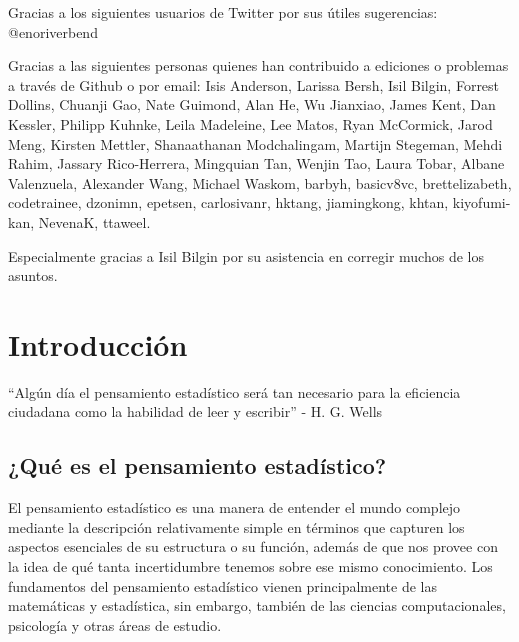 \documentclass[
  12pt,
]{book}
\begin{document}
Gracias a los siguientes usuarios de Twitter por sus útiles sugerencias: @enoriverbend

Gracias a las siguientes personas quienes han contribuido a ediciones o problemas a través de Github o por email:
Isis Anderson, Larissa Bersh, Isil Bilgin, Forrest Dollins, Chuanji Gao, Nate Guimond, Alan He, Wu Jianxiao, James Kent, Dan Kessler, Philipp Kuhnke, Leila Madeleine, Lee Matos, Ryan McCormick, Jarod Meng, Kirsten Mettler, Shanaathanan Modchalingam, Martijn Stegeman, Mehdi Rahim, Jassary Rico-Herrera, Mingquian Tan, Wenjin Tao, Laura Tobar, Albane Valenzuela, Alexander Wang, Michael Waskom,
barbyh, basicv8vc, brettelizabeth, codetrainee, dzonimn, epetsen, carlosivanr, hktang, jiamingkong, khtan, kiyofumi-kan, NevenaK, ttaweel.

Especialmente gracias a Isil Bilgin por su asistencia en corregir muchos de los asuntos.

\hypertarget{introduction}{%
\chapter{Introducción}\label{introduction}}

``Algún día el pensamiento estadístico será tan necesario para la eficiencia ciudadana como la habilidad de leer y escribir'' - H. G. Wells

\hypertarget{quuxe9-es-el-pensamiento-estaduxedstico}{%
\section{¿Qué es el pensamiento estadístico?}\label{quuxe9-es-el-pensamiento-estaduxedstico}}

El pensamiento estadístico es una manera de entender el mundo complejo mediante la descripción relativamente simple en términos que capturen los aspectos esenciales de su estructura o su función, además de que nos provee con la idea de qué tanta incertidumbre tenemos sobre ese mismo conocimiento. Los fundamentos del pensamiento estadístico vienen principalmente de las matemáticas y estadística, sin embargo, también de las ciencias computacionales, psicología y otras áreas de estudio.
\end{document}
